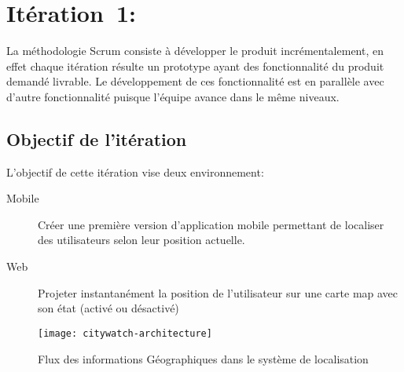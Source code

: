 \chapter[Itération~1:~(~2/22/2017~-~3/5/2017~)]{Itération~1:~\textup{}}


La méthodologie Scrum consiste à développer le produit incrémentalement, en
effet chaque itération résulte un prototype ayant des fonctionnalité du produit
demandé livrable. Le développement de ces fonctionnalité est en parallèle avec
d'autre fonctionnalité puisque l'équipe avance dans le même niveaux.

\section{Objectif de l'itération}

L'objectif de cette itération vise deux environnement:

\begin{description}
    \item [Mobile] Créer une première version d'application mobile permettant
        de localiser des utilisateurs selon leur position actuelle.
    \item [Web] Projeter instantanément la position de l'utilisateur sur une
        carte map avec son état (activé ou désactivé)
\end{description}

\begin{figure}[htbp]
    \centering
    \texttt{[image: citywatch-architecture]}
    \caption[Flux des information Géographiques en ]
    {Flux des informations Géographiques dans le système de localisation}
\label{fig:citywatch-architecture}
\end{figure}



